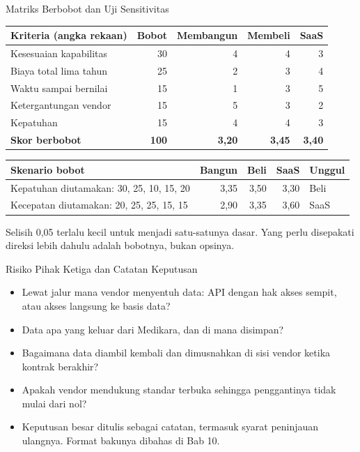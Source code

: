 \documentclass[aspectratio=169, table, 12pt]{beamer}
\begin{document}
\begin{frame}{{\Large Matriks Berbobot dan Uji Sensitivitas}}
  \footnotesize
  \begin{tabularx}{\textwidth}{Xrrrr}
    \hline
    \textbf{Kriteria (angka rekaan)} & \textbf{Bobot} & \textbf{Membangun} & \textbf{Membeli} & \textbf{SaaS} \\
    \hline
    Kesesuaian kapabilitas & 30 & 4 & 4 & 3 \\
    \hline
    Biaya total lima tahun & 25 & 2 & 3 & 4 \\
    \hline
    Waktu sampai bernilai & 15 & 1 & 3 & 5 \\
    \hline
    Ketergantungan vendor & 15 & 5 & 3 & 2 \\
    \hline
    Kepatuhan & 15 & 4 & 4 & 3 \\
    \hline
    \textbf{Skor berbobot} & \textbf{100} & \textbf{3,20} & \textbf{3,45} & \textbf{3,40} \\
    \hline
  \end{tabularx}

  \vspace{6pt}
  \begin{tabularx}{\textwidth}{Xrrrl}
    \hline
    \textbf{Skenario bobot} & \textbf{Bangun} & \textbf{Beli} & \textbf{SaaS} & \textbf{Unggul} \\
    \hline
    Kepatuhan diutamakan: 30, 25, 10, 15, 20 & 3,35 & 3,50 & 3,30 & Beli \\
    \hline
    Kecepatan diutamakan: 20, 25, 25, 15, 15 & 2,90 & 3,35 & 3,60 & SaaS \\
    \hline
  \end{tabularx}

  \vspace{6pt}
  \small Selisih 0,05 terlalu kecil untuk menjadi satu-satunya dasar. Yang perlu disepakati direksi
  lebih dahulu adalah bobotnya, bukan opsinya.
\end{frame}

\begin{frame}{{\Large Risiko Pihak Ketiga dan Catatan Keputusan}}
  \small
  \vspace{6pt}
  \begin{itemize}
    \item Lewat jalur mana vendor menyentuh data: API dengan hak akses sempit, atau akses langsung ke
          basis data?
    \item Data apa yang keluar dari Medikara, dan di mana disimpan?
    \item Bagaimana data diambil kembali dan dimusnahkan di sisi vendor ketika kontrak berakhir?
    \item Apakah vendor mendukung standar terbuka sehingga penggantinya tidak mulai dari nol?
    \item Keputusan besar ditulis sebagai catatan, termasuk syarat peninjauan ulangnya. Format bakunya
          dibahas di Bab 10.
  \end{itemize}
\end{frame}
\end{document}
